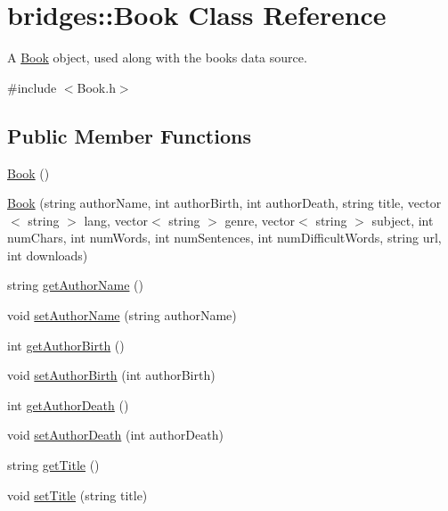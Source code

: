 \hypertarget{classbridges_1_1_book}{}\section{bridges\+:\+:Book Class Reference}
\label{classbridges_1_1_book}


A \hyperlink{classbridges_1_1_book}{Book} object, used along with the books data source.  




{\ttfamily \#include $<$Book.\+h$>$}

\subsection*{Public Member Functions}
\begin{DoxyCompactItemize}
\item 
\hyperlink{classbridges_1_1_book_abb2903c640bd263a2e077d52e12a773e}{Book} ()
\item 
\hyperlink{classbridges_1_1_book_ac3060f3eaf757c82ea21f6501eb97b80}{Book} (string author\+Name, int author\+Birth, int author\+Death, string title, vector$<$ string $>$ lang, vector$<$ string $>$ genre, vector$<$ string $>$ subject, int num\+Chars, int num\+Words, int num\+Sentences, int num\+Difficult\+Words, string url, int downloads)
\item 
string \hyperlink{classbridges_1_1_book_a0204002c3242950404f348d5c5016693}{get\+Author\+Name} ()
\item 
void \hyperlink{classbridges_1_1_book_affc38232dda1e6b04d7e38a02cdd9c39}{set\+Author\+Name} (string author\+Name)
\item 
int \hyperlink{classbridges_1_1_book_aab2b100c668996d17c45817b81323d93}{get\+Author\+Birth} ()
\item 
void \hyperlink{classbridges_1_1_book_adca4d6766fa0068e23926ae95ed8411f}{set\+Author\+Birth} (int author\+Birth)
\item 
int \hyperlink{classbridges_1_1_book_a73014b2bb34b951d5ce5b4223c9fec8d}{get\+Author\+Death} ()
\item 
void \hyperlink{classbridges_1_1_book_a044ad1b1b6418d7545c6f957b2757bcd}{set\+Author\+Death} (int author\+Death)
\item 
string \hyperlink{classbridges_1_1_book_ab69bb95904587455af97c6fd6299bc1d}{get\+Title} ()
\item 
void \hyperlink{classbridges_1_1_book_a277540665913ac1a4a943af99dad46bb}{set\+Title} (string title)
\item 

\end{DoxyCompactItemize}
